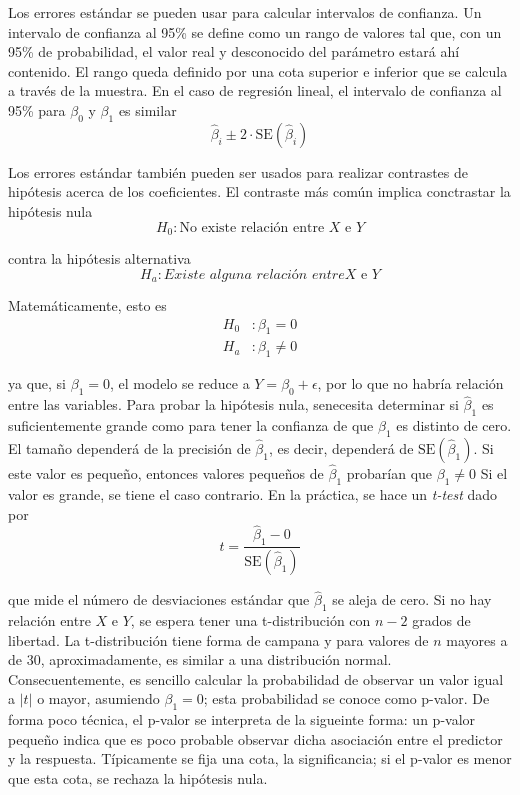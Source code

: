 Los errores estándar se pueden usar para calcular intervalos de confianza. Un intervalo de confianza al 95\% se define como un rango de valores tal que, con un 95\% de probabilidad, el valor real y desconocido del parámetro estará ahí contenido. El rango queda definido por una cota superior e inferior que se calcula a través de la muestra. En el caso de regresión lineal, el intervalo de confianza al 95\% para $\beta_0$ y $\beta_1$ es similar
\begin{equation}
\hat{\beta}_i \pm 2 \cdot \text{SE}(\hat{\beta}_i)
\end{equation}

Los errores estándar también pueden ser usados para realizar contrastes de hipótesis acerca de los coeficientes. El contraste más común implica conctrastar la hipótesis nula 
\begin{equation}
H_0 : \text{No existe relación entre } X \text{ e } Y
\end{equation}

\noindent contra la hipótesis alternativa 
\begin{equation}
H_a : \textit{Existe alguna relación entre} X \text{ e } Y
\end{equation}

\noindent Matemáticamente, esto es 
\begin{align}
H_0 &: \beta_1 = 0 \\
H_a &: \beta_1 \neq 0
\end{align}

ya que, si $\beta_1 = 0$, el modelo se reduce a $Y = \beta_0 + \epsilon$, por lo que no habría relación entre las variables. Para probar la hipótesis nula, senecesita determinar si $\hat{\beta}_1$ es suficientemente grande como para tener la confianza de que $\beta_1$ es distinto de cero. El tamaño dependerá de la precisión de $\hat{\beta}_1$, es decir, dependerá de $\text{SE}(\hat{\beta}_1)$. Si este valor es pequeño, entonces valores pequeños de $\hat{\beta}_1$ probarían que $\beta_1 \neq 0$ Si el valor es grande, se tiene el caso contrario. En la práctica, se hace un \textit{t-test} dado por 
\begin{equation}
t = \frac{\hat{\beta}_1 - 0}{\text{SE}(\hat{\beta}_1)}
\end{equation}

que mide el número de desviaciones estándar que $\hat{\beta}_1$ se aleja de cero. Si no hay relación entre $X$ e $Y$, se espera tener una t-distribución con $n-2$ grados de libertad. La t-distribución tiene forma de campana y para valores de $n$ mayores a de 30, aproximadamente, es similar a una distribución normal. Consecuentemente, es sencillo calcular la probabilidad de observar un valor igual a $|t|$ o mayor, asumiendo $\beta_1 = 0$; esta probabilidad se conoce como p-valor. De forma poco técnica, el p-valor se interpreta de la sigueinte forma: un p-valor pequeño indica que es poco probable observar dicha asociación entre el predictor y la respuesta. Típicamente se fija una cota, la significancia; si el p-valor es menor que esta cota, se rechaza la hipótesis nula. 

